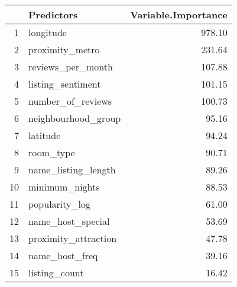 \begin{table}[ht]
\centering
\begin{tabular}{rlr}
  \hline
 & Predictors & Variable.Importance \\ 
  \hline
1 & longitude & 978.10 \\ 
  2 & proximity\_metro & 231.64 \\ 
  3 & reviews\_per\_month & 107.88 \\ 
  4 & listing\_sentiment & 101.15 \\ 
  5 & number\_of\_reviews & 100.73 \\ 
  6 & neighbourhood\_group & 95.16 \\ 
  7 & latitude & 94.24 \\ 
  8 & room\_type & 90.71 \\ 
  9 & name\_listing\_length & 89.26 \\ 
  10 & minimum\_nights & 88.53 \\ 
  11 & popularity\_log & 61.00 \\ 
  12 & name\_host\_special & 53.69 \\ 
  13 & proximity\_attraction & 47.78 \\ 
  14 & name\_host\_freq & 39.16 \\ 
  15 & listing\_count & 16.42 \\ 
   \hline
\end{tabular}
\end{table}
